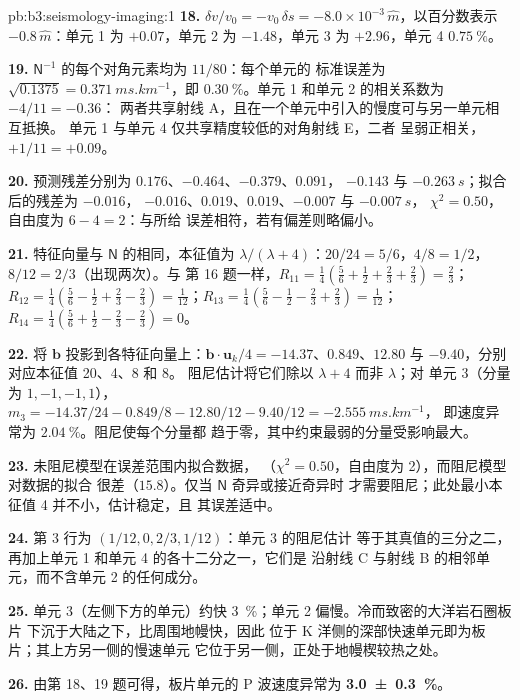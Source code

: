 \begin{solution}{pb:b3:seismology-imaging:1}
\textbf{18.} $\delta v/v_0 = -v_0\,\delta s = -8.0\times10^{-3}\,\hat m$，以百分数表示
$-0.8\,\hat m$：单元 1 为 $+0.07$，单元 2 为 $-1.48$，单元 3 为 $+2.96$，单元 4
$\qty{+0.75}{\percent}$。

\textbf{19.} $\mathsf N^{-1}$ 的每个对角元素均为 $11/80$：每个单元的
标准误差为 $\sqrt{0.1375} = \qty{0.371}{ms.km^{-1}}$，即
$\qty{0.30}{\percent}$。单元 1 和单元 2 的相关系数为 $-4/11 = -0.36$：
两者共享射线 A，且在一个单元中引入的慢度可与另一单元相互抵换。
单元 1 与单元 4 仅共享精度较低的对角射线 E，二者
呈弱正相关，$+1/11 = +0.09$。

\textbf{20.} 预测残差分别为 $0.176$、$-0.464$、$-0.379$、$0.091$，
$-0.143$ 与 $\qty{-0.263}{s}$；拟合后的残差为 $-0.016$，
$-0.016$、$0.019$、$0.019$、$-0.007$ 与 $\qty{-0.007}{s}$，
$\chi^2 = 0.50$，自由度为 $6 - 4 = 2$：与所给
误差相符，若有偏差则略偏小。

\textbf{21.} 特征向量与 $\mathsf N$ 的相同，本征值为
$\lambda/(\lambda + 4)$：$20/24 = 5/6$，$4/8 = 1/2$，$8/12 = 2/3$（出现两次）。与
第 16 题一样，$R_{11} = \tfrac14(\tfrac56 + \tfrac12 + \tfrac23 + \tfrac23) =
\tfrac23$；$R_{12} = \tfrac14(\tfrac56 - \tfrac12 + \tfrac23 - \tfrac23) =
\tfrac1{12}$；$R_{13} = \tfrac14(\tfrac56 - \tfrac12 - \tfrac23 + \tfrac23) =
\tfrac1{12}$；$R_{14} = \tfrac14(\tfrac56 + \tfrac12 - \tfrac23 - \tfrac23) = 0$。

\textbf{22.} 将 $\mathbf b$ 投影到各特征向量上：$\mathbf b\cdot\mathbf u_k/4
= -14.37$、$0.849$、$12.80$ 与 $-9.40$，分别对应本征值 20、4、8 和 8。
阻尼估计将它们除以 $\lambda + 4$ 而非 $\lambda$；对
单元 3（分量为 $1, -1, -1, 1$），
$m_3 = -14.37/24 - 0.849/8 - 12.80/12 - 9.40/12 = \qty{-2.555}{ms.km^{-1}}$，
即速度异常为 $\qty{+2.04}{\percent}$。阻尼使每个分量都
趋于零，其中约束最弱的分量受影响最大。

\textbf{23.} 未阻尼模型在误差范围内拟合数据，
（$\chi^2 = 0.50$，自由度为 2），而阻尼模型对数据的拟合
很差（$15.8$）。仅当 $\mathsf N$ 奇异或接近奇异时
才需要阻尼；此处最小本征值 4 并不小，估计稳定，且
其误差适中。

\textbf{24.} 第 3 行为 $(1/12, 0, 2/3, 1/12)$：单元 3 的阻尼估计
等于其真值的三分之二，再加上单元 1 和单元 4 的各十二分之一，它们是
沿射线 C 与射线 B 的相邻单元，而不含单元 2 的任何成分。

\textbf{25.} 单元 3（左侧下方的单元）约快
\qty{3}{\percent}；单元 2 偏慢。冷而致密的大洋岩石圈板片
下沉于大陆之下，比周围地幔快，因此
位于 K 洋侧的深部快速单元即为板片；其上方另一侧的慢速单元
它位于另一侧，正处于地幔楔较热之处。

\textbf{26.} 由第 18、19 题可得，板片单元的 P 波速度异常为
\textbf{\qty[text-series-to-math=true, uncertainty-mode=separate]{3.0 \pm 0.3}{\percent}}。
\end{solution}
